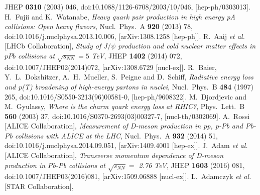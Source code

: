 \documentclass[b5paper,10pt,twoside,oldstyle,classica]{toptesi}
\begin{document}
\begin{thebibliography}{10}
  JHEP {\bf 0310} (2003) 046,
  doi:10.1088/1126-6708/2003/10/046,
  [hep-ph/0303013].
  H.~Fujii and K.~Watanabe,
  \textit{Heavy quark pair production in high energy pA collisions: Open heavy flavors},
  Nucl.\ Phys.\ A {\bf 920} (2013) 78,
  doi:10.1016/j.nuclphysa.2013.10.006,
  [arXiv:1308.1258 [hep-ph]].
  R.~Aaij {\it et al.} [LHCb Collaboration],
  \textit{Study of $J/\psi$ production and cold nuclear matter effects in $pPb$ collisions at $\sqrt{s_{NN}} = 5$ TeV},
  JHEP {\bf 1402} (2014) 072,
  doi:10.1007/JHEP02(2014)072,
  [arXiv:1308.6729 [nucl-ex]].
  R.~Baier, Y.~L.~Dokshitzer, A.~H.~Mueller, S.~Peigne and D.~Schiff,
  \textit{Radiative energy loss and p(T) broadening of high-energy partons in nuclei},
  Nucl.\ Phys.\ B {\bf 484} (1997) 265,
  doi:10.1016/S0550-3213(96)00581-0,
  [hep-ph/9608322].
  M.~Djordjevic and M.~Gyulassy,
  \textit{Where is the charm quark energy loss at RHIC?},
  Phys.\ Lett.\ B {\bf 560} (2003) 37,
  doi:10.1016/S0370-2693(03)00327-7,
  [nucl-th/0302069].
  A.~Rossi [ALICE Collaboration],
  \textit{Measurement of D-meson production in pp, p-Pb and Pb-Pb collisions with ALICE at the LHC},
  Nucl.\ Phys.\ A {\bf 932} (2014) 51,
  doi:10.1016/j.nuclphysa.2014.09.051,
  [arXiv:1409.4001 [hep-ex]].
  J.~Adam {\it et al.} [ALICE Collaboration],
  \textit{Transverse momentum dependence of D-meson production in Pb-Pb collisions at $\sqrt{s_{NN}}=$ 2.76 TeV},
  JHEP {\bf 1603} (2016) 081,
  doi:10.1007/JHEP03(2016)081,
  [arXiv:1509.06888 [nucl-ex]].
   L.~Adamczyk {\it et al.} [STAR Collaboration],

\end{thebibliography}
\end{document}
